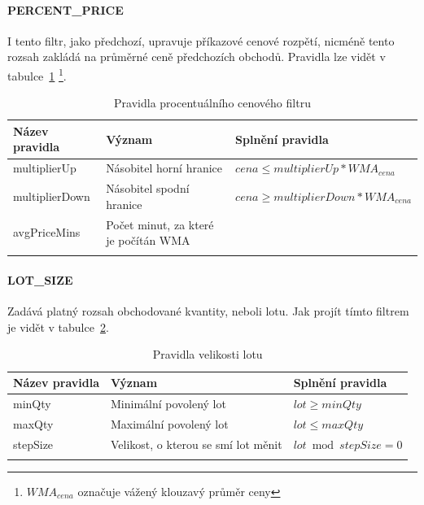 \paragraph*{PERCENT\_PRICE}
I tento filtr, jako předchozí, upravuje příkazové cenové rozpětí, nicméně tento rozsah zakládá na průměrné ceně předchozích obchodů. Pravidla lze vidět v tabulce~\ref{tab:binance:percent_price}
\footnote{$WMA_{cena}$ označuje vážený klouzavý průměr ceny}.
\begin{center}
    \begin{longtable}[h]{|l|l|l|}
        \hline
        Název pravidla & Význam                               & Splnění pravidla                           \\
        \hline
        multiplierUp   & Násobitel horní hranice              & $ cena \leq multiplierUp * WMA_{cena} $    \\ 
        \hline
        multiplierDown & Násobitel spodní hranice             & $ cena \geq  multiplierDown * WMA_{cena} $ \\ 
        \hline
        avgPriceMins   & Počet minut, za které je počítán WMA &                                            \\ 
        \hline
        \caption{Pravidla procentuálního cenového filtru}
        \label{tab:binance:percent_price}
    \end{longtable}
\end{center}

\paragraph*{LOT\_SIZE}
Zadává platný rozsah obchodované kvantity, neboli lotu. Jak projít tímto filtrem je vidět v tabulce~\ref{tab:binance:lot_filter}.
\begin{center}
    \begin{longtable}[h]{|l|l|l|}
        \hline
        Název pravidla & Význam                              & Splnění pravidla         \\
        \hline
        minQty         & Minimální povolený lot              & $ lot \geq minQty $      \\ 
        \hline
        maxQty         & Maximální povolený lot              & $ lot \leq  maxQty $     \\ 
        \hline
        stepSize       & Velikost, o kterou se smí lot měnit & $lot \bmod stepSize = 0$ \\ 
        \hline
        \caption{Pravidla velikosti lotu}
        \label{tab:binance:lot_filter}
    \end{longtable}
\end{center}

